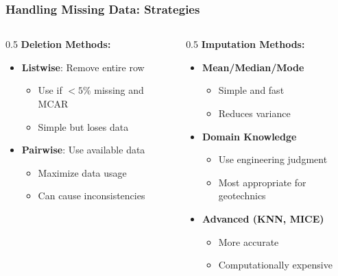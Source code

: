 \documentclass[aspectratio=169]{beamer}
\begin{document}
\begin{frame}
\frametitle{Handling Missing Data: Strategies}

\begin{columns}[T]
    \begin{column}{0.5\textwidth}
        \textbf{Deletion Methods:}
        \begin{itemize}
            \item \textbf{Listwise}: Remove entire row
            \begin{itemize}
                \item Use if $<5\%$ missing and MCAR
                \item Simple but loses data
            \end{itemize}
            \item \textbf{Pairwise}: Use available data
            \begin{itemize}
                \item Maximize data usage
                \item Can cause inconsistencies
            \end{itemize}
        \end{itemize}
    \end{column}
    \begin{column}{0.5\textwidth}
        \textbf{Imputation Methods:}
        \begin{itemize}
            \item \textbf{Mean/Median/Mode}
            \begin{itemize}
                \item Simple and fast
                \item Reduces variance
            \end{itemize}
            \item \textbf{Domain Knowledge}
            \begin{itemize}
                \item Use engineering judgment
                \item Most appropriate for geotechnics
            \end{itemize}
            \item \textbf{Advanced (KNN, MICE)}
            \begin{itemize}
                \item More accurate
                \item Computationally expensive
            \end{itemize}
        \end{itemize}
    \end{column}
\end{columns}

\end{frame}
\end{document}

